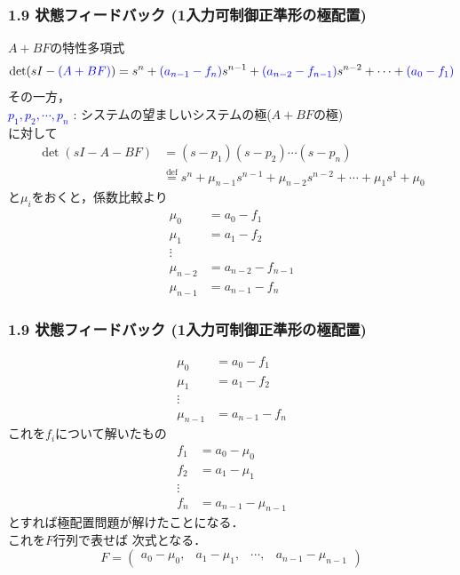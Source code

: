 \documentclass[10pt]{beamer}
\begin{document}
\begin{frame}[t]
\frametitle{1.9 状態フィードバック (1入力可制御正準形の極配置)}
$A+BF$の特性多項式
\begin{equation}
 \operatorname{det} (sI-\textcolor{blue}{(A+BF)}) = s^n + \textcolor{blue}{(a_{n-1}-f_n)} s^{n-1}
  + \textcolor{blue}{(a_{n-2}-f_{n-1})} s^{n-2} + \cdots 
  + \textcolor{blue}{(a_0-f_1)}

\end{equation}
その一方，\\
\textcolor{blue}{$p_1, p_2, \cdots, p_n$} : システムの望ましいシステムの極($A+BF$の極)\\
に対して
\begin{align}
 \operatorname{det} (s I - A - B F)
 &= (s - p_1)(s - p_2) \cdots (s - p_n) \nonumber \\
 &\stackrel{\text{def}}{=} s^n + \mu_{n-1} s^{n-1} + \mu_{n-2} s^{n-2}
  + \cdots + \mu_1 s^1 + \mu_0

\end{align}
と$\mu_i$をおくと，係数比較より
\begin{align}
 \mu_0 & = a_0-f_1    \nonumber\\
 \mu_{1} & = a_1-f_2  \nonumber\\
 \vdots \\
 \mu_{n-2} & = a_{n-2}-f_{n-1} \nonumber\\
 \mu_{n-1} & = a_{n-1}-f_n    \nonumber
\end{align}
\end{frame}


\begin{frame}[t]
\frametitle{1.9 状態フィードバック (1入力可制御正準形の極配置)}
 

\begin{align}
 \mu_0 & = a_0-f_1    \nonumber\\
 \mu_{1} & = a_1-f_2  \nonumber\\
 \vdots \\
 \mu_{n-1} & = a_{n-1}-f_n    \nonumber
\end{align}
これを$f_i$について解いたもの
\begin{align}
 f_1 & = a_0-\mu_0
\nonumber\\
 f_2 & = a_1-\mu_{1}
\nonumber\\
 \vdots
\nonumber\\
 f_n& = a_{n-1}-\mu_{n-1}
\nonumber
\end{align}
とすれば極配置問題が解けたことになる．\\
これを$F$行列で表せば
次式となる．
\begin{equation}
 {F} = \left(\begin{array}{cccc}
            a_0-\mu_0, & a_1-\mu_1, & \cdots, & a_{n-1}-\mu_{n-1}
     \end{array}\right)
\end{equation}

\end{frame}
\end{document}

